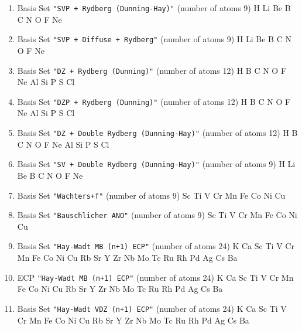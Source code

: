 \begin{enumerate}
\item Basis Set \verb#"SVP + Rydberg (Dunning-Hay)"# (number of atoms 9)  \newline 
  H Li Be B C N O F Ne


\item Basis Set \verb#"SVP + Diffuse + Rydberg"# (number of atoms 9)  \newline 
  H Li Be B C N O F Ne


\item Basis Set \verb#"DZ + Rydberg (Dunning)"# (number of atoms 12)  \newline 
  H B C N O F Ne Al Si P S Cl


\item Basis Set \verb#"DZP + Rydberg (Dunning)"# (number of atoms 12)  \newline 
  H B C N O F Ne Al Si P S Cl


\item Basis Set \verb#"DZ + Double Rydberg (Dunning-Hay)"# (number of atoms 12)  \newline 
  H B C N O F Ne Al Si P S Cl


\item Basis Set \verb#"SV + Double Rydberg (Dunning-Hay)"# (number of atoms 9)  \newline 
  H Li Be B C N O F Ne


\item Basis Set \verb#"Wachters+f"# (number of atoms 9)  \newline 
  Sc Ti V Cr Mn Fe Co Ni Cu


\item Basis Set \verb#"Bauschlicher ANO"# (number of atoms 9)  \newline 
  Sc Ti V Cr Mn Fe Co Ni Cu


\item Basis Set \verb#"Hay-Wadt MB (n+1) ECP"# (number of atoms 24)  \newline 
  K Ca Sc Ti V Cr Mn Fe Co Ni Cu Rb Sr Y Zr Nb Mo Tc Ru Rh Pd Ag Cs Ba


\item ECP \verb#"Hay-Wadt MB (n+1) ECP"# (number of atoms 24)  \newline 
  K Ca Sc Ti V Cr Mn Fe Co Ni Cu Rb Sr Y Zr Nb Mo Tc Ru Rh Pd Ag Cs Ba


\item Basis Set \verb#"Hay-Wadt VDZ (n+1) ECP"# (number of atoms 24)  \newline 
  K Ca Sc Ti V Cr Mn Fe Co Ni Cu Rb Sr Y Zr Nb Mo Tc Ru Rh Pd Ag Cs Ba



\end{enumerate}
